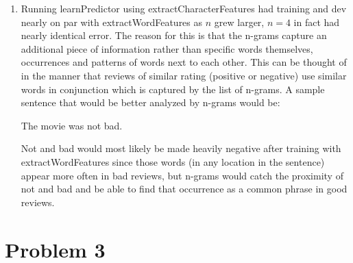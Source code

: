 \documentclass[12pt]{article}
\begin{document}
\begin{enumerate}[label=(\alph*)]
		\item Running learnPredictor using extractCharacterFeatures had training and dev
			nearly on par with extractWordFeatures as \(n\) grew larger, \(n = 4\) in fact
			had nearly identical error. The reason for this is that the n-grams capture
			an additional piece of information rather than specific words themselves,
			occurrences and patterns of words next to each other. This can be thought of
			in the manner that reviews of similar rating (positive or negative) use
			similar words in conjunction which is captured by the list of n-grams.
			A sample sentence that would be better analyzed by n-grams would be:

			The movie was not bad.

			Not and bad would most likely be made heavily negative after training with
			extractWordFeatures since those words (in any location in the sentence)
			appear more often in bad reviews, but n-grams would catch the proximity
			of not and bad and be able to find that occurrence as a common phrase in
			good reviews.

	\end{enumerate}

	\section*{Problem 3}
\end{document}
